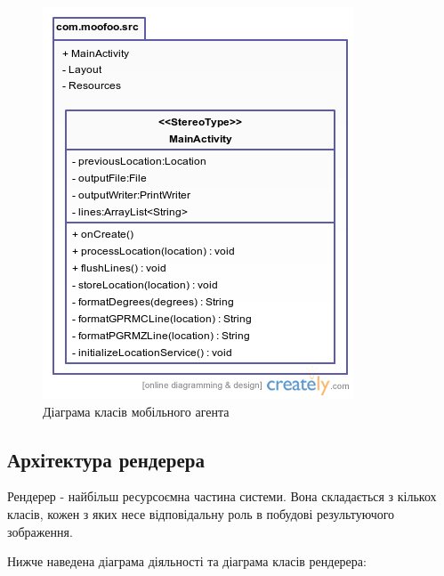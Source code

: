 \documentclass[simple,a4paper,14pt,ukrainian,utf8]{eskdtext}
\begin{document}
    \vspace{3em}
    \begin{figure}
    	\centering \includegraphics[scale=0.75]{images/mobile_agent_classes.png}
    	\caption{Діаграма класів мобільного агента}
    \end{figure}

    \subsection{Архітектура рендерера}
    
    Рендерер - найбільш ресурсоємна частина системи. Вона складається з кількох класів, кожен з яких несе відповідальну роль в побудові результуючого зображення.
    
    Нижче наведена діаграма діяльності та діаграма класів рендерера:
    
\end{document}
